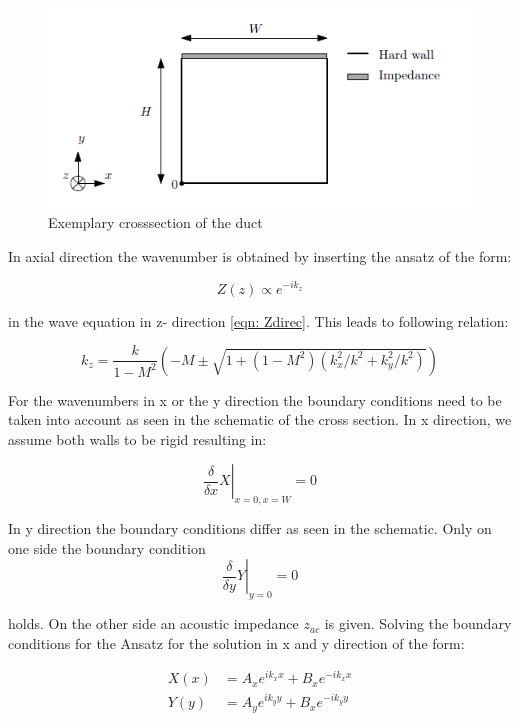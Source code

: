 \documentclass[11pt]{report} %
\begin{document}
\begin{figure}[H]
\centering
\includegraphics[scale=0.8]{./Figures/Boundary}
\caption{Exemplary crosssection of the duct}
\end{figure}

In axial direction the wavenumber is obtained by inserting the ansatz of the form: 

\begin{equation}
Z(z)\propto e^{-ik_z}
\end{equation}  

in the wave equation in z- direction \ref{eqn: Zdirec}.
This leads to following relation:

\begin{equation}\label{eqn: Impdet2}
    k_z = \frac{k}{1-M^2} \left( -M \pm \sqrt{1+(1-M^2)(k_x^2/k^2 + k_y^2/k^2)}\right)    
\end{equation}

For the wavenumbers in x or the y direction the boundary conditions need to be taken into account as seen in the schematic of the cross section.
In x direction, we assume both walls to be rigid resulting in:
 
\begin{equation}
\left.\frac{\delta}{\delta x}X\right\rvert_{x=0,x=W}=0
\end{equation}

In y direction the boundary conditions differ as seen in the schematic. 
Only on one side the boundary condition 
\begin{equation}
\left.\frac{\delta}{\delta y}Y\right\rvert_{y=0}=0
\end{equation}

holds.
On the other side an acoustic impedance $z_{ac}$ is given.
Solving the boundary conditions for the Ansatz for the solution in x and y direction of the form: 

\begin{subequations}
\begin{align}
X(x)&=A_xe^{ik_xx}+B_xe^{-ik_xx}\\
Y(y)&=A_ye^{ik_yy}+B_xe^{-ik_yy}
\end{align}
\end{subequations}
 
\end{document}
